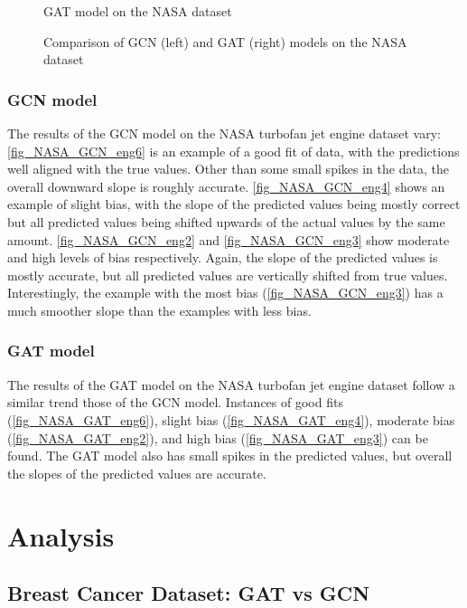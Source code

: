 \documentclass[12pt]{article}
\begin{document}
\begin{figure}[H]
\begin{minipage}[t]{0.48\textwidth}
        \caption*{GAT model on the NASA dataset}
    \end{minipage}

    \caption{Comparison of GCN (left) and GAT (right) models on the NASA dataset}
    \label{fig_GCN_GAT_NASA}
\end{figure}

\subsubsection{GCN model} \label{subsubsection_gcnplotsNASA}
The results of the GCN model on the NASA turbofan jet engine dataset vary: \autoref{fig_NASA_GCN_eng6} is an example of a good fit of data, with the predictions well aligned with the true values. Other than some small spikes in the data, the overall downward slope is roughly accurate. \autoref{fig_NASA_GCN_eng4} shows an example of slight bias, with the slope of the predicted values being mostly correct but all predicted values being shifted upwards of the actual values by the same amount. \autoref{fig_NASA_GCN_eng2} and \autoref{fig_NASA_GCN_eng3} show moderate and high levels of bias respectively. Again, the slope of the predicted values is mostly accurate, but all predicted values are vertically shifted from true values. Interestingly, the example with the most bias (\autoref{fig_NASA_GCN_eng3}) has a much smoother slope than the examples with less bias.


\subsubsection{GAT model} \label{subsubsection_gatplotsNASA}

The results of the GAT model on the NASA turbofan jet engine dataset follow a similar trend those of the GCN model. Instances of good fits (\autoref{fig_NASA_GAT_eng6}), slight bias (\autoref{fig_NASA_GAT_eng4}), moderate bias (\autoref{fig_NASA_GAT_eng2}), and high bias (\autoref{fig_NASA_GAT_eng3}) can be found. The GAT model also has small spikes in the predicted values, but overall the slopes of the predicted values are accurate.






\pagebreak
\section{Analysis} \label{sec_analysis}

\subsection{Breast Cancer Dataset: GAT vs GCN}
\end{document}
